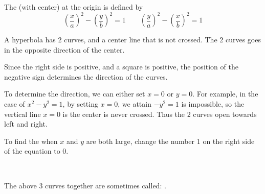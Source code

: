 \documentclass[11pt,fleqn]{book} %
\begin{document}
\begin{definition}[Hyperbola]
    The  (with center) at the origin is defined by $$\left(\frac{x}{a}\right)^2 - \left(\frac{y}{b}\right)^2 = 1 \qquad \left(\frac{y}{a}\right)^2 - \left(\frac{x}{b}\right)^2 = 1$$

    A hyperbola has 2 curves, and a center line that is not crossed. The 2 curves goes in the opposite direction of the center.
\end{definition}

\begin{center}
\end{center}

Since the right side is positive, and a square is positive, the position of the negative sign determines the direction of the curves.

To determine the direction, we can either set $x = 0$ or $y = 0$. For example, in the case of $x^2 - y^2 = 1$, by setting $x = 0$, we attain $-y^2 = 1$ is impossible, so the vertical line $x = 0$ is the center is never crossed. Thus the 2 curves open towards left and right.

To find the  when $x$ and $y$ are both large, change the number $1$ on the right side of the equation to $0$.

{~~~}

The above 3 curves together are sometimes called: .
\end{document}
